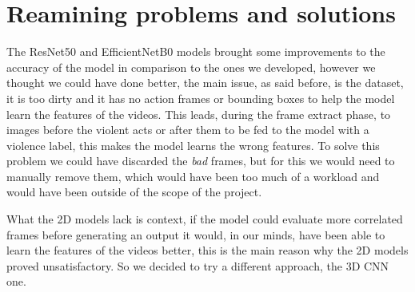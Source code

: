 \begin{table}[]
\centering
{}
\caption{EfficientNetB0 accuracy and recall}
\label{tab:EfficientNetB0 }
\end{table}
\section{Reamining problems and solutions}
The ResNet50 and EfficientNetB0 models brought some improvements to the accuracy of the model in comparison to the ones we developed, however we thought we could have done better, the main issue, as said before, is the dataset, it is too dirty and it has no action frames or bounding boxes to help the model learn the features of the videos. This leads, during the frame extract phase, to images before the violent acts or after them to be fed to the model with a violence label, this makes the model learns the wrong features. To solve this problem we could have discarded the \textit{bad} frames, but for this we would need to manually remove them, which would have been too much of a workload and would have been outside of the scope of the project.

What the 2D models lack is context, if the model could evaluate more correlated frames before generating an output it would, in our minds, have been able to learn the features of the videos better, this is the main reason why the 2D models proved unsatisfactory. So we decided to try a different approach, the 3D CNN one.
